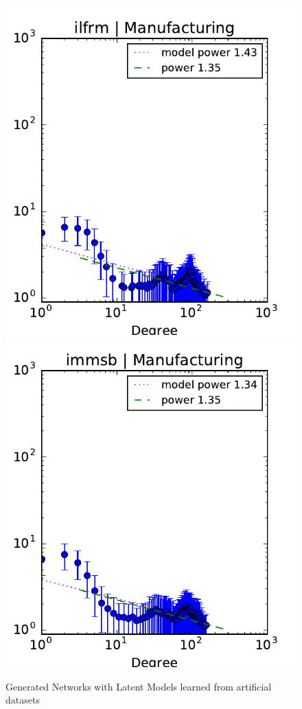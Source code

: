 \begin{figure}[h]
	\endminipage
	\vspace{-0.4cm}
	\includegraphics[scale=0.4]{img/ilfrm_manufacturing_d}
	\endminipage
	\includegraphics[scale=0.4]{img/immsb_manufacturing_d}
	\endminipage
	
	\caption{Generated Networks with Latent Models learned from artificial datasets}
	\label{fig:gen_graph}
\end{figure}






